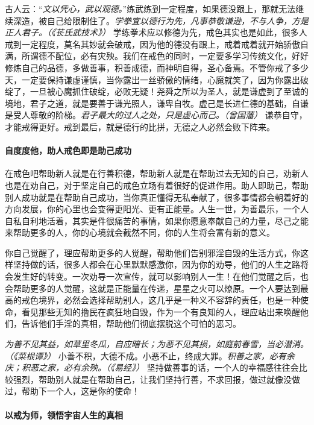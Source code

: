 古人云：“\textit{文以凭心，武以观德。}”练武练到一定程度，如果德没跟上，那就无法继续深造，被自己给限制住了。\textit{学拳宜以德行为先，凡事恭敬谦逊，不与人争，方是正人君子。（《苌氏武技术》）} 学练拳术应以修德为先，戒色其实也是如此，很多人戒到一定程度，莫名其妙就会破戒，因为他的德没有跟上，戒着戒着就开始骄傲自满，所谓德不配位，必有灾殃。我们在戒色的同时，一定要多学习传统文化，好好修炼自己的品德，多做善事，积善成德，而神明自得，圣心备焉。不管你戒了多少天，一定要保持谦虚谨慎，当你露出一丝骄傲的情绪，心魔就笑了，因为你露出破绽了，一旦被心魔抓住破绽，必败无疑！尧舜之所以为圣人，就是谦虚到了至诚的境地，君子之道，就是要善于谦光照人，谦卑自牧。虚己是长进仁德的基础，自谦是受人尊敬的阶梯。\textit{君子最大的过人之处，只是虚心而己。（曾国藩）} 谦恭自守，才能戒得更好。戒到最后，就是德行的比拼，无德之人必然会败下阵来。

\paragraph{自度度他，助人戒色即是助己成功}

在戒色吧帮助新人就是在行善积德，帮助新人就是在帮助过去无知的自己，劝新人也是在劝自己，对于坚定自己的戒色立场有着很好的促进作用。助人即助己，帮助别人成功就是在帮助自己成功，当你真正懂得无私奉献了，很多事情都会朝着好的方向发展，你的心里也会变得更阳光、更有正能量。人生一世，为善最乐，一个人自私自利地活着，其实是件很痛苦的事情，如果你愿意奉献自己的力量，尽己之能来帮助更多的人，你的心境就会截然不同，你的人生将会富有新的意义。

你自己觉醒了，理应帮助更多的人觉醒，帮助他们告别邪淫自毁的生活方式，你这样坚持做的话，很多人都会在心里默默感激你，因为你的劝导，他们的人生之路将会发生好的转变。一次劝导一次宣传，就可以影响别人一生！在他们觉醒之后，也会帮助更多的人觉醒，这就是正能量在传递，星星之火可以燎原。一个人要达到最高的戒色境界，必然会选择帮助别人，这几乎是一种义不容辞的责任，也是一种使命，看见那些无知的撸民在疯狂地自毁，作为一个有良知的人，理应站出来唤醒他们，告诉他们手淫的真相，帮助他们彻底摆脱这个可怕的恶习。

\textit{为善不见其益，如草里冬瓜，自应暗长；为恶不见其损，如庭前春雪，当必潜消。（《菜根谭》）} 小善不积，大德不成。小恶不止，终成大罪。\textit{积善之家，必有余庆；积恶之家，必有余殃。（《易经》）} 坚持做善事的话，一个人的幸福感往往会比较强烈，帮助别人就是在帮助自己，让我们坚持行善，不求回报，做过就像没做过，帮助下一个人，这是你的使命！

\paragraph{以戒为师，领悟宇宙人生的真相}


